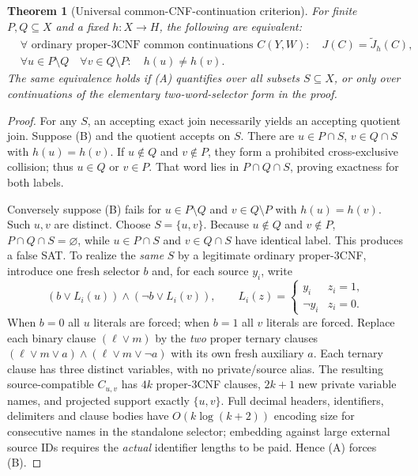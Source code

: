 \documentclass[11pt]{article}
\newtheorem{theorem}{Theorem}
\begin{document}
\begin{theorem}[Universal common-CNF-continuation criterion]\label{th:iff}
For finite $P,Q\subseteq X$ and a fixed $h:X\to H$, the following
are equivalent:
\[
\begin{split}
& \forall\text{ ordinary proper-3CNF common continuations }C(Y,W):
          \quad J(C)=\widetilde J_h(C), \tag{A}\\
& \forall u\in P\setminus Q\quad
  \forall v\in Q\setminus P:\quad h(u)\ne h(v). \tag{B}
\end{split}
\]
The same equivalence holds if (A) quantifies over \emph{all}
subsets $S\subseteq X$, or only over continuations of the elementary
two-word-selector form in the proof.
\end{theorem}
\begin{proof}
For any $S$, an accepting exact join necessarily yields an accepting
quotient join. Suppose (B) and the quotient accepts on $S$.
There are $u\in P\cap S$, $v\in Q\cap S$ with $h(u)=h(v)$.
If $u\notin Q$ and $v\notin P$, they form a prohibited
cross-exclusive collision; thus $u\in Q$ or $v\in P$.
That word lies in $P\cap Q\cap S$, proving exactness for both labels.

Conversely suppose (B) fails for $u\in P\setminus Q$ and
$v\in Q\setminus P$ with $h(u)=h(v)$. Such $u,v$ are distinct.
Choose $S=\{u,v\}$. Because $u\notin Q$ and $v\notin P$,
$P\cap Q\cap S=\varnothing$, while $u\in P\cap S$ and
$v\in Q\cap S$ have identical label. This produces a false SAT.
To realize the \emph{same} $S$ by a legitimate ordinary proper-3CNF,
introduce one fresh selector $b$ and, for each source $y_i$, write
\[
(b\lor L_i(u))\land(\neg b\lor L_i(v)),
\qquad
L_i(z)=
\begin{cases}y_i&z_i=1,\\ \neg y_i&z_i=0.\end{cases}
\]
When $b=0$ all $u$ literals are forced; when $b=1$ all
$v$ literals are forced. Replace each binary clause $(\ell\lor m)$
by the \emph{two} proper ternary clauses
$(\ell\lor m\lor a)\land(\ell\lor m\lor\neg a)$
with its own fresh auxiliary $a$. Each ternary clause has
three distinct variables, with no private/source alias.
The resulting source-compatible $C_{u,v}$ has $4k$
proper-3CNF clauses, $2k+1$ new private variable names,
and projected support exactly $\{u,v\}$.
Full decimal headers, identifiers, delimiters and clause bodies
have $O(k\log(k+2))$ encoding size for consecutive names
in the standalone selector; embedding against large external
source IDs requires the \emph{actual} identifier lengths to be paid.
Hence (A) forces (B).
\end{proof}
\end{document}
